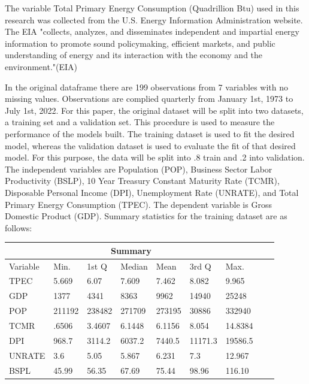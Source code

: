 \documentclass[12pt]{article}
\begin{document}
The variable Total Primary Energy Consumption (Quadrillion Btu) used in this research was collected from the U.S. Energy Information Administration website. 
The EIA "collects, analyzes, and disseminates independent and impartial energy information to promote sound policymaking, efficient markets, and public understanding of energy and its interaction with the economy and the environment."(EIA)

In the original dataframe there are 199 observations from 7 variables with no missing values.
Observations are complied quarterly from January 1st, 1973 to July 1st, 2022.  
For this paper, the original dataset will be split into two datasets, a training set and a validation set. 
This procedure is used to measure the performance of the models built. 
The training dataset is used to fit the desired model, whereas the validation dataset is used to evaluate the fit of that desired model. 
For this purpose, the data will be split into .8 train and .2 into validation.
The independent variables are Population (POP), Business Sector Labor Productivity (BSLP), 10 Year Treasury Constant Maturity Rate (TCMR), Disposable Personal Income (DPI), Unemployment Rate (UNRATE), and Total Primary Energy Consumption (TPEC). 
The dependent variable is Gross Domestic Product (GDP).
Summary statistics for the training dataset are as follows:
\begin{center}
\begin{tabular}{ |p{1.75cm}||p{1.25cm}|p{1.25cm}|p{1.25cm}|p{1.25cm}|p{1.25cm}|p{1.25cm}|p{1.25cm}|p{1.25cm}| }
  \hline
  \multicolumn{7}{|c|}{Summary} \\
  \hline
  Variable & Min. & 1st Q & Median & Mean & 3rd Q & Max. \\
  \hline
  TPEC & 5.669 & 6.07& 7.609 & 7.462 & 8.082 & 9.965\\
  GDP &  1377 & 4341 & 8363 & 9962 & 14940 & 25248\\
  POP & 211192 & 238482 & 271709 & 273195 & 30886 & 332940\\
  TCMR & .6506 & 3.4607 & 6.1448 & 6.1156 & 8.054 & 14.8384\\
  DPI & 968.7 & 3114.2 & 6037.2 & 7440.5 & 11171.3 & 19586.5\\
  UNRATE & 3.6 & 5.05 & 5.867 & 6.231 & 7.3 & 12.967\\
  BSPL & 45.99 & 56.35 & 67.69 & 75.44 & 98.96 & 116.10\\
  \hline
\end{tabular}
\end{center}
\end{document}
